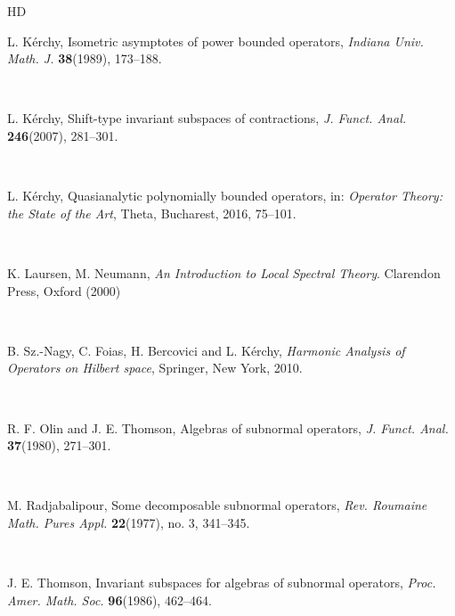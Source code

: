 \documentclass[a4paper,oneside,11pt]{amsart}
\numberwithin{equation}{section}
\theoremstyle{plain}
\theoremstyle{definition}
\begin{document}
\begin{thebibliography}{HD}
\ 

  L. K\'erchy, Isometric asymptotes of power bounded operators, 
  \emph{Indiana Univ. Math. J.} {\bf 38}(1989), 173--188. 

\ 

 L. K\'erchy, Shift-type invariant subspaces of contractions, 
 \emph{J. Funct. Anal.} {\bf 246}(2007), 281--301.

\ 

  L. K\'erchy,  Quasianalytic polynomially bounded operators,
in: \emph{Operator Theory: the State of the Art}, Theta, Bucharest, 2016, 75--101.

\ 

 K. Laursen, M. Neumann, \emph{An Introduction to Local Spectral Theory}. Clarendon
Press, Oxford (2000)
 
 \ 

 B. Sz.-Nagy,  C. Foias, H. Bercovici and L. K\'erchy, 
\emph{Harmonic Analysis of Operators on Hilbert space}, 
 Springer, New York, 2010. 

\ 

 R. F. Olin and J. E. Thomson, Algebras of subnormal operators,  
 \emph{J. Funct. Anal.} {\bf 37}(1980), 271--301.

 \ 

 M. Radjabalipour, Some decomposable subnormal operators, 
\emph{Rev. Roumaine Math. Pures Appl.} {\bf 22}(1977), no. 3, 341--345.
 
\ 

 J. E. Thomson, Invariant subspaces for algebras of subnormal operators, 
\emph{Proc. Amer. Math. Soc.} {\bf 96}(1986), 
 462--464.

\end{thebibliography}
\end{document}
